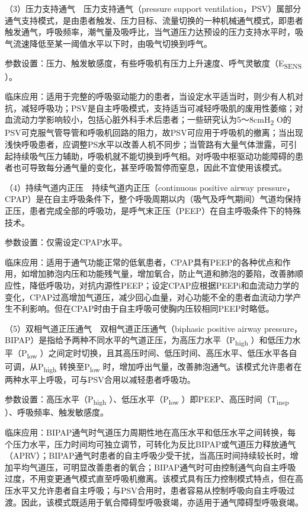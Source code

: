 （3）压力支持通气　压力支持通气（pressure support
ventilation，PSV）属部分通气支持模式，是由患者触发、压力目标、流量切换的一种机械通气模式，即患者触发通气，呼吸频率，潮气量及吸呼比，当气道压力达预设的压力支持水平时，吸气流速降低至某一阈值水平以下时，由吸气切换到呼气。

参数设置：压力、触发敏感度，有些呼吸机有压力上升速度、呼气灵敏度（E\textsubscript{SENS}
）。

临床应用：适用于完整的呼吸驱动能力的患者，当设定水平适当时，则少有人机对抗，减轻呼吸功；PSV是自主呼吸模式，支持适当可减轻呼吸肌的废用性萎缩；对血流动力学影响较小，包括心脏外科手术后患者；一些研究认为5～8cmH\textsubscript{2}
O的PSV可克服气管导管和呼吸机回路的阻力，故PSV可应用于呼吸机的撤离；当出现浅快呼吸患者，应调整PS水平以改善人机不同步；当管路有大量气体泄露，可引起持续吸气压力辅助，呼吸机就不能切换到呼气相。对呼吸中枢驱动功能障碍的患者也可导致每分通气量的变化，甚至呼吸暂停而窒息，因此不宜使用该模式。

（4）持续气道内正压　持续气道内正压（continuous positive airway
pressure，CPAP）是在自主呼吸条件下，整个呼吸周期以内（吸气及呼气期间）气道均保持正压，患者完成全部的呼吸功，是呼气末正压（PEEP）在自主呼吸条件下的特殊技术。

参数设置：仅需设定CPAP水平。

临床应用：适用于通气功能正常的低氧患者，CPAP具有PEEP的各种优点和作用，如增加肺泡内压和功能残气量，增加氧合，防止气道和肺泡的萎陷，改善肺顺应性，降低呼吸功，对抗内源性PEEP；设定CPAP应根据PEEPi和血流动力学的变化，CPAP过高增加气道压，减少回心血量，对心功能不全的患者血流动力学产生不利影响。但在CPAP时由于自主呼吸可使胸内压较相同PEEP时略低。

（5）双相气道正压通气　双相气道正压通气（biphasic positive airway
pressure，BIPAP）是指给予两种不同水平的气道正压，为高压力水平（P\textsubscript{high}
）和低压力水平（P\textsubscript{low}
）之间定时切换，且其高压时间、低压时间、高压水平、低压水平各自可调，从P\textsubscript{high}
转换至P\textsubscript{low}
时，增加呼出气量，改善肺泡通气。该模式允许患者在两种水平上呼吸，可与PSV合用以减轻患者呼吸功。

参数设置：高压水平（P\textsubscript{high}
）、低压水平（P\textsubscript{low}
）即PEEP、高压时间（T\textsubscript{insp} ）、呼吸频率、触发敏感度。

临床应用：BIPAP通气时气道压力周期性地在高压水平和低压水平之间转换，每个压力水平，压力时间均可独立调节，可转化为反比BIPAP或气道压力释放通气（APRV）；BIPAP通气时患者的自主呼吸少受干扰，当高压时间持续较长时，增加平均气道压，可明显改善患者的氧合；BIPAP通气时可由控制通气向自主呼吸过度，不用变更通气模式直至呼吸机撤离。该模式具有压力控制模式特点，但在高压水平又允许患者自主呼吸；与PSV合用时，患者容易从控制呼吸向自主呼吸过渡。因此，该模式既适用于氧合障碍型呼吸衰竭，亦适用于通气障碍型呼吸衰竭。

